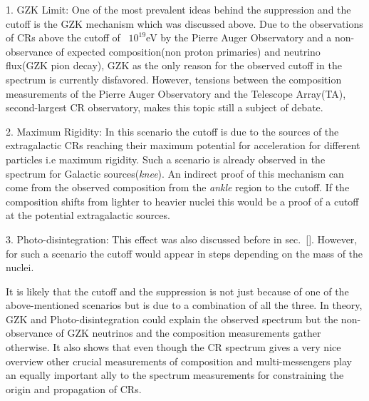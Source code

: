 1. GZK Limit: One of the most prevalent ideas behind the suppression and the cutoff is the GZK mechanism which was discussed above. Due to the observations of CRs above the cutoff of ~$10^{19}$eV by the Pierre Auger Observatory and a non-observance of expected composition(non proton primaries) and neutrino flux(GZK pion decay), GZK as the only reason for the observed cutoff in the spectrum is currently disfavored. However, tensions between the composition measurements of the Pierre Auger Observatory and the Telescope Array(TA), second-largest CR observatory, makes this topic still a subject of debate.

2. Maximum Rigidity: In this scenario the cutoff is due to the sources of the extragalactic CRs reaching their maximum potential for acceleration for different particles i.e maximum rigidity. Such a scenario is already observed in the spectrum for Galactic sources(\textit{knee}). An indirect proof of this mechanism can come from the observed composition from the \textit{ankle} region to the cutoff. If the composition shifts from lighter to heavier nuclei this would be a proof of a cutoff at the potential extragalactic sources. 

3. Photo-disintegration: This effect was also discussed before in sec.~\ref{}. However, for such a scenario the cutoff would appear in steps depending on the mass of the nuclei. 

It is likely that the cutoff and the suppression is not just because of one of the above-mentioned scenarios but is due to a combination of all the three. In theory, GZK and Photo-disintegration could explain the observed spectrum but the non-observance of GZK neutrinos and the composition measurements gather otherwise. It also shows that even though the CR spectrum gives a very nice overview other crucial measurements of composition and multi-messengers play an equally important ally to the spectrum measurements for constraining the origin and propagation of CRs.

